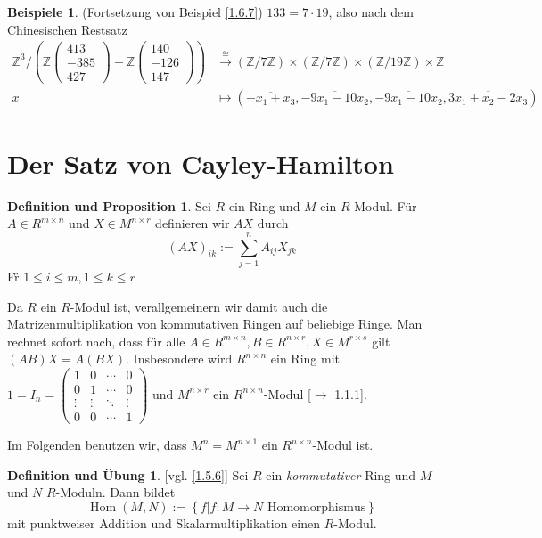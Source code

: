 \documentclass[
twoside=semi,
fontsize=12,
DIV=12, 
cleardoublepage=current,
leqno,
headings=optiontoheadandtoc, 
toc=idx
]{scrbook}
\newcommand{\Z}{\mathbb{Z}}
\newcommand{\brac}[1]{\left( #1 \right)}
\newcommand{\set}[1]{\left\{ #1 \right\}}
\DeclareMathOperator{\Hom}{Hom}
\theoremstyle{definition}
\newtheorem{beispiele}[definition]{Beispiele}
\newtheorem{def-prop}[definition]{Definition und Proposition}
\newtheorem{def-ueb}[definition]{Definition und \"Ubung}
\begin{document}
	\begin{beispiele}\label{1.6.12}
		(Fortsetzung von Beispiel \ref{1.6.7})\newline
		$133 = 7 \cdot 19$, also nach dem Chinesischen Restsatz
		\begin{align*}
			\Z^3/\brac{\Z\begin{pmatrix}413\\-385\\427\end{pmatrix} + \Z\begin{pmatrix}140\\-126\\147\end{pmatrix}} &\overset{\cong}{\rightarrow} (\Z/7\Z) \times (\Z/7\Z) \times (\Z/19\Z) \times \Z\\
				x &\mapsto (\overline{-x_1+x_3}, \overline{-9x_1-10x_2}, \overline{-9x_1-10x_2}, \overline{3x_1+x_2-2x_3})
		\end{align*}
	\end{beispiele}

	\newpage
	\section{Der Satz von Cayley-Hamilton}
	\begin{def-prop}\label{1.7.1}
		Sei $R$ ein Ring und $M$ ein $R$-Modul. F\"ur $A \in R^{m\times n}$ und $X\in M^{n\times r}$ definieren wir $AX$ durch
			\[(AX)_{ik} := \sum_{j=1}^n A_{ij}X_{jk}\]
		F\"r $1\leq i \leq m, 1 \leq k \leq r$
		
		Da $R$ ein $R$-Modul ist, verallgemeinern wir damit auch die Matrizenmultiplikation von kommutativen Ringen auf beliebige Ringe. Man rechnet sofort nach, dass f\"ur alle $A \in R^{m\times n}, B \in R^{n \times r}, X \in M^{r \times s}$ gilt $(AB)X = A(BX)$. Insbesondere wird $R^{n \times n}$ ein Ring mit $1 = I_n = \begin{pmatrix}
			1 & 0 & \cdots & 0\\
			0 & 1 & \cdots & 0\\
			\vdots & \vdots & \ddots & \vdots\\
			0 & 0 & \cdots & 1
		\end{pmatrix}$ und $M^{n \times r}$ ein $R^{n \times n}$-Modul [$\to$ 1.1.1].
	
		Im Folgenden benutzen wir, dass $M^n = M^{n\times 1}$ ein $R^{n\times n}$-Modul ist.
	\end{def-prop}
	
	\begin{def-ueb}\label{1.7.2}
		[vgl. \ref{1.5.6}]\newline
		Sei $R$ ein \emph{kommutativer} Ring und $M$ und $N$ $R$-Moduln. Dann bildet 
			\[\Hom(M,N) := \set{f|f:M \to N \textrm{ Homomorphismus}}\]
		mit punktweiser Addition und Skalarmultiplikation einen $R$-Modul.
	\end{def-ueb}
\end{document}
